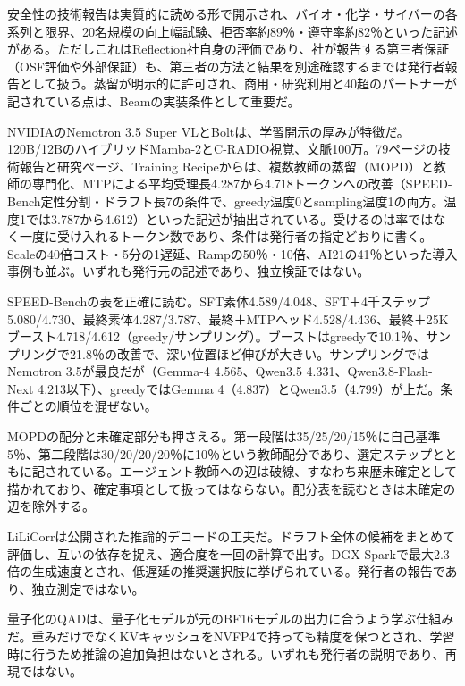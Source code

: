 \documentclass[lualatex,a4paper,10pt]{jlreq}
\begin{document}
安全性の技術報告は実質的に読める形で開示され、バイオ・化学・サイバーの各系列と限界、20名規模の向上幅試験、拒否率約89％・遵守率約82％といった記述がある。ただしこれはReflection社自身の評価であり、社が報告する第三者保証（OSF評価や外部保証）も、第三者の方法と結果を別途確認するまでは発行者報告として扱う。蒸留が明示的に許可され、商用・研究利用と40超のパートナーが記されている点は、Beamの実装条件として重要だ。
\cite{B17,B19,B18,B16}


NVIDIAのNemotron 3.5 Super VLとBoltは、学習開示の厚みが特徴だ。120B/12BのハイブリッドMamba-2とC-RADIO視覚、文脈100万。79ページの技術報告と研究ページ、Training Recipeからは、複数教師の蒸留（MOPD）と教師の専門化、MTPによる平均受理長4.287から4.718トークンへの改善（SPEED-Bench定性分割・ドラフト長7の条件で、greedy温度0とsampling温度1の両方。温度1では3.787から4.612）といった記述が抽出されている。受けるのは率ではなく一度に受け入れるトークン数であり、条件は発行者の指定どおりに書く。Scaleの40倍コスト・5分の1遅延、Rampの50％・10倍、AI21の41％といった導入事例も並ぶ。いずれも発行元の記述であり、独立検証ではない。
\cite{B21,B72,B22,B20}


SPEED-Benchの表を正確に読む。SFT素体4.589/4.048、SFT＋4千ステップ5.080/4.730、最終素体4.287/3.787、最終＋MTPヘッド4.528/4.436、最終＋25Kブースト4.718/4.612（greedy/サンプリング）。ブーストはgreedyで10.1％、サンプリングで21.8％の改善で、深い位置ほど伸びが大きい。サンプリングではNemotron 3.5が最良だが（Gemma-4 4.565、Qwen3.5 4.331、Qwen3.8-Flash-Next 4.213以下）、greedyではGemma 4（4.837）とQwen3.5（4.799）が上だ。条件ごとの順位を混ぜない。
\cite{B21,B72,B22,B20}


MOPDの配分と未確定部分も押さえる。第一段階は35/25/20/15％に自己基準5％、第二段階は30/20/20/20％に10％という教師配分であり、選定ステップとともに記されている。エージェント教師への辺は破線、すなわち来歴未確定として描かれており、確定事項として扱ってはならない。配分表を読むときは未確定の辺を除外する。
\cite{B21,B72,B22,B20}


LiLiCorrは公開された推論的デコードの工夫だ。ドラフト全体の候補をまとめて評価し、互いの依存を捉え、適合度を一回の計算で出す。DGX Sparkで最大2.3倍の生成速度とされ、低遅延の推奨選択肢に挙げられている。発行者の報告であり、独立測定ではない。
\cite{B21,B72,B22,B20}


量子化のQADは、量子化モデルが元のBF16モデルの出力に合うよう学ぶ仕組みだ。重みだけでなくKVキャッシュをNVFP4で持っても精度を保つとされ、学習時に行うため推論の追加負担はないとされる。いずれも発行者の説明であり、再現ではない。
\cite{B21,B72,B22,B20}
\end{document}
